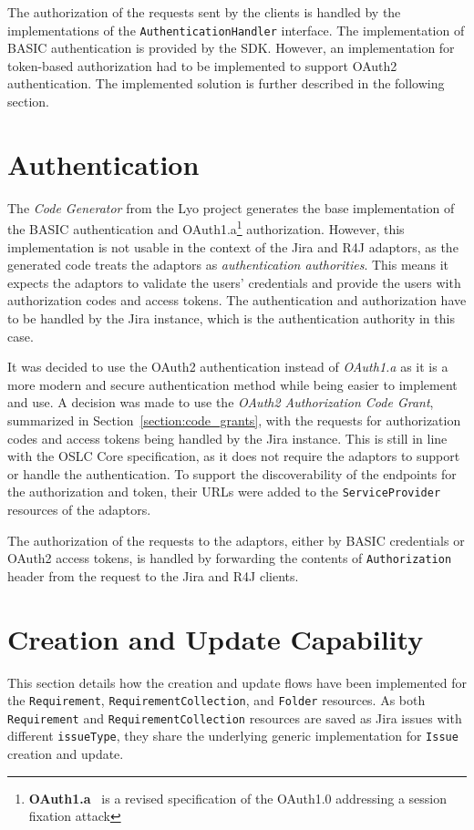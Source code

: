 The authorization of the requests sent by the clients is handled by the implementations of the \texttt{AuthenticationHandler} interface. The implementation of BASIC authentication is provided by the SDK. However, an implementation for token-based authorization had to be implemented to support OAuth2 authentication. The implemented solution is further described in the following section.

\section{Authentication}
The \emph{Code Generator} from the Lyo project generates the base implementation of the BASIC authentication and OAuth1.a\footnote{\textbf{OAuth1.a} \cite{oauth1a} is a revised specification of the OAuth1.0 addressing a session fixation attack} authorization. However, this implementation is not usable in the context of the Jira and R4J adaptors, as the generated code treats the adaptors as \emph{authentication authorities}. This means it expects the adaptors to validate the users' credentials and provide the users with authorization codes and access tokens. The authentication and authorization have to be handled by the Jira instance, which is the authentication authority in this case.

It was decided to use the OAuth2 authentication instead of \emph{OAuth1.a} as it is a more modern and secure authentication method while being easier to implement and use. A decision was made to use the \emph{OAuth2 Authorization Code Grant}, summarized in Section \ref{section:code_grants}, with the requests for authorization codes and access tokens being handled by the Jira instance. This is still in line with the OSLC Core specification, as it does not require the adaptors to support or handle the authentication. To support the discoverability of the endpoints for the authorization and token, their URLs were added to the \texttt{ServiceProvider} resources of the adaptors.

The authorization of the requests to the adaptors, either by BASIC credentials or OAuth2 access tokens, is handled by forwarding the contents of \texttt{Authorization} header from the request to the Jira and R4J clients.

\section{Creation and Update Capability}
This section details how the creation and update flows have been implemented for the \texttt{Requirement}, \texttt{RequirementCollection}, and \texttt{Folder} resources. As both \texttt{Requirement} and \texttt{RequirementCollection} resources are saved as Jira issues with different \texttt{issueType}, they share the underlying generic implementation for \texttt{Issue} creation and update.

